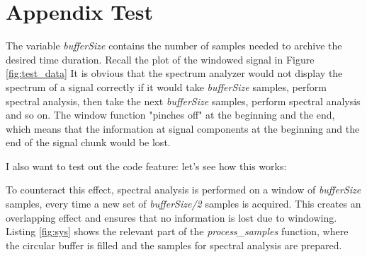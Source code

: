 \section{Appendix Test}
The variable \textit{bufferSize} contains the number of samples needed to archive the desired time duration. Recall the plot of the windowed signal in Figure \ref{fig:test_data} It is obvious that the spectrum analyzer would not display the spectrum of a signal correctly if it would take \textit{bufferSize} samples, perform spectral analysis, then take the next \textit{bufferSize} samples, perform spectral analysis and so on. The window function "pinches off" at the beginning and the end, which means that the information at signal components at the beginning and the end of the signal chunk would be lost.

I also want to test out the code feature: let's see how this works:


To counteract this effect, spectral analysis is performed on a window of \textit{bufferSize} samples, every time a new set of \textit{bufferSize/2} samples is acquired. This creates an overlapping effect and ensures that no information is lost due to windowing. Listing \ref{fig:sys} shows the relevant part of the \textit{process\_samples} function, where the circular buffer is filled and the samples for spectral analysis are prepared.
